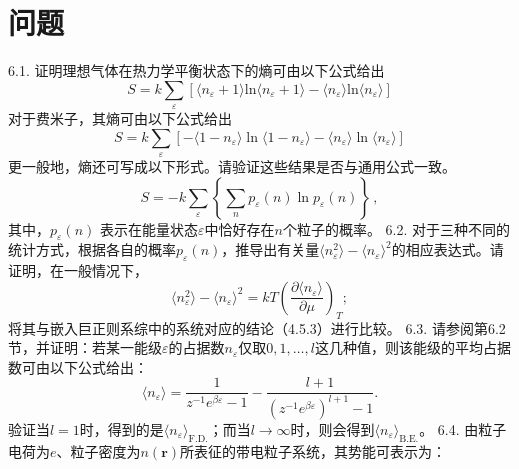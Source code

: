 \section{问题}\label{ux95eeux9898_chap6}
6.1. 证明理想气体在热力学平衡状态下的熵可由以下公式给出
\begin{equation}\tag{6.6.13}\label{eq:6.6.13}
S = k \sum _ { \varepsilon } [ \langle n _ { \varepsilon } + 1 \rangle \mathrm { l n } \langle n _ { \varepsilon } + 1 \rangle - \langle n _ { \varepsilon } \rangle \mathrm { l n } \langle n _ { \varepsilon } \rangle ]
\end{equation}
对于费米子，其熵可由以下公式给出
\begin{equation}\tag{6.6.14}\label{eq:6.6.14}
S = k \sum _ { \varepsilon } [ - \langle 1 - n _ { \varepsilon } \rangle \ln \langle 1 - n _ { \varepsilon } \rangle - \langle n _ { \varepsilon } \rangle \ln \langle n _ { \varepsilon } \rangle ]
\end{equation}
更一般地，熵还可写成以下形式。请验证这些结果是否与通用公式一致。
\begin{equation}\tag{6.6.15}\label{eq:6.6.15}
S = - k \sum _ { \varepsilon } \left\{ \sum _ { n } p _ { \varepsilon } ( n ) \ln p _ { \varepsilon } ( n ) \right\} \, ,
\end{equation}
其中，\(p_{\varepsilon}(n)\) 表示在能量状态\(\varepsilon\)中恰好存在\(n\)个粒子的概率。
6.2. 对于三种不同的统计方式，根据各自的概率\(p_{\varepsilon}(n)\)，推导出有关量\(\langle n_{\varepsilon}^{2}\rangle - \langle n_{\varepsilon}\rangle^{2}\)的相应表达式。请证明，在一般情况下，
\begin{equation}\tag{6.6.16}\label{eq:6.6.16}
\langle n _ { \varepsilon } ^{2} \rangle - \langle n _ { \varepsilon } \rangle ^{2} = k T \left( \frac { \partial \langle n _ { \varepsilon } \rangle } { \partial \mu } \right) _ { T } ;
\end{equation}
将其与嵌入巨正则系综中的系统对应的结论（4.5.3）进行比较。
6.3. 请参阅第6.2节，并证明：若某一能级\(\varepsilon\)的占据数\(n_{\varepsilon}\)仅取\(0,1,\ldots,l\)这几种值，则该能级的平均占据数可由以下公式给出：
\begin{equation}\tag{6.6.17}\label{eq:6.6.17}
\langle n _ { \varepsilon } \rangle = \frac { 1 } { z ^{- 1} e ^{\beta \varepsilon} - 1 } - \frac { l + 1 } { ( z ^{- 1} e ^{\beta \varepsilon} ) ^{l + 1} - 1 } .
\end{equation}
验证当\(l=1\)时，得到的是\(\langle n_{\varepsilon}\rangle_{\mathrm{F.D.}}\)；而当\(l\to\infty\)时，则会得到\(\langle n_{\varepsilon}\rangle_{\mathrm{B.E.}}\)。
6.4. 由粒子电荷为\(e\)、粒子密度为\(n(\boldsymbol{r})\)所表征的带电粒子系统，其势能可表示为：
